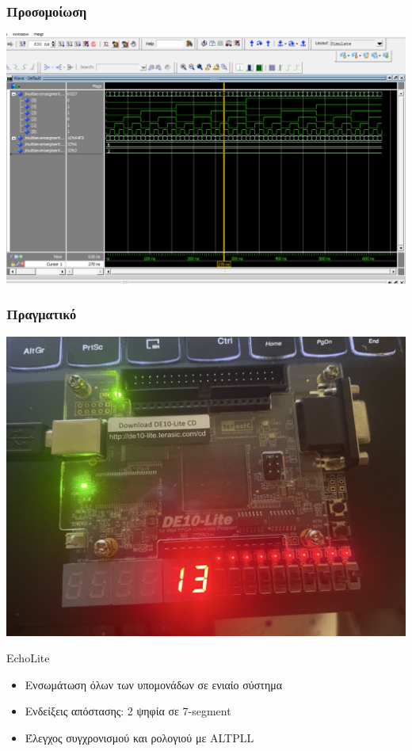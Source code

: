 \documentclass{beamer}
\begin{document}
\begin{frame}
\frametitle{Προσομοίωση}
	\centerline{\includegraphics[width=1\textwidth]{assets/mssd-tb.png}}
\end{frame}

\begin{frame}
\frametitle{Πραγματικό}
	\centerline{\includegraphics[angle=90, width=1\textwidth]{assets/mssd-real.jpeg}}
\end{frame}

\begin{frame}{EchoLite}
\begin{itemize}
  \item Ενσωμάτωση όλων των υπομονάδων σε ενιαίο σύστημα
  \item Ενδείξεις απόστασης: 2 ψηφία σε 7-segment
  \item Έλεγχος συγχρονισμού και ρολογιού με ALTPLL
\end{itemize}
\end{frame}
\end{document}
